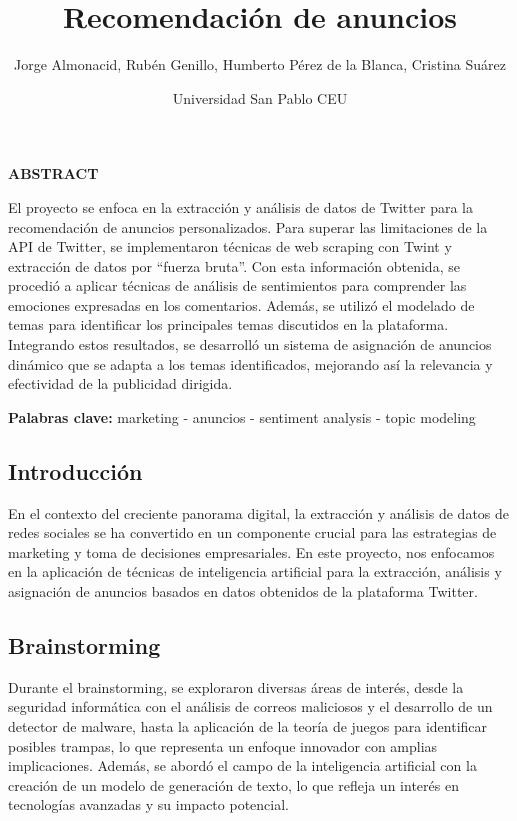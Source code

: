 \documentclass[
  letterpaper,
  DIV=11,
  numbers=noendperiod]{scrartcl}
\title{Recomendación de anuncios}
\author{Jorge Almonacid, Rubén Genillo, Humberto Pérez de la Blanca,
Cristina Suárez \and Universidad San Pablo CEU}
\date{}
\renewcommand*\contentsname{Tabla de contenidos}
\newcommand\contentsname{Tabla de contenidos}
\begin{document}
\maketitle

\renewcommand*\contentsname{Indice}
{
\hypersetup{linkcolor=}
\setcounter{tocdepth}{3}
\tableofcontents
}
\textbf{ABSTRACT}

El proyecto se enfoca en la extracción y análisis de datos de Twitter
para la recomendación de anuncios personalizados. Para superar las
limitaciones de la API de Twitter, se implementaron técnicas de web
scraping con Twint y extracción de datos por ``fuerza bruta''. Con esta
información obtenida, se procedió a aplicar técnicas de análisis de
sentimientos para comprender las emociones expresadas en los
comentarios. Además, se utilizó el modelado de temas para identificar
los principales temas discutidos en la plataforma. Integrando estos
resultados, se desarrolló un sistema de asignación de anuncios dinámico
que se adapta a los temas identificados, mejorando así la relevancia y
efectividad de la publicidad dirigida.

\textbf{Palabras clave:} marketing - anuncios - sentiment analysis -
topic modeling

\newpage{}

\subsection{Introducción}\label{introducciuxf3n}

En el contexto del creciente panorama digital, la extracción y análisis
de datos de redes sociales se ha convertido en un componente crucial
para las estrategias de marketing y toma de decisiones empresariales. En
este proyecto, nos enfocamos en la aplicación de técnicas de
inteligencia artificial para la extracción, análisis y asignación de
anuncios basados en datos obtenidos de la plataforma Twitter.

\subsection{Brainstorming}\label{brainstorming}

Durante el brainstorming, se exploraron diversas áreas de interés, desde
la seguridad informática con el análisis de correos maliciosos y el
desarrollo de un detector de malware, hasta la aplicación de la teoría
de juegos para identificar posibles trampas, lo que representa un
enfoque innovador con amplias implicaciones. Además, se abordó el campo
de la inteligencia artificial con la creación de un modelo de generación
de texto, lo que refleja un interés en tecnologías avanzadas y su
impacto potencial.
\end{document}
